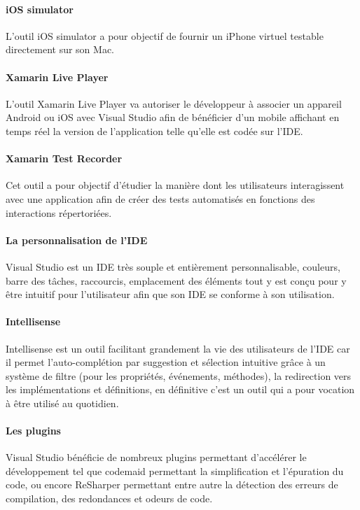 \documentclass[11]{article}
\begin{document}
\paragraph{iOS simulator}
L’outil iOS simulator a pour objectif de fournir un iPhone virtuel testable directement sur son Mac.

\paragraph{Xamarin Live Player}
L’outil Xamarin Live Player va autoriser le développeur à associer un appareil Android ou iOS avec Visual Studio afin de bénéficier d’un mobile affichant en temps réel la version de l’application telle qu’elle est codée sur l’IDE.
   
\paragraph{Xamarin Test Recorder}
Cet outil a pour objectif d’étudier la manière dont les utilisateurs interagissent avec une application afin de créer des tests automatisés en fonctions des interactions répertoriées.

\paragraph{La personnalisation de l’IDE}
Visual Studio est un IDE très souple et entièrement personnalisable, couleurs, barre des tâches, raccourcis, emplacement des éléments tout y est conçu pour y être intuitif pour l’utilisateur afin que son IDE se conforme à son utilisation.

\paragraph{Intellisense}
Intellisense est un outil facilitant grandement la vie des utilisateurs de l’IDE car il permet l’auto-complétion par suggestion et sélection intuitive grâce à un système de filtre (pour les propriétés, événements, méthodes), la redirection vers les implémentations et définitions, en définitive c’est un outil qui a pour vocation à être utilisé au quotidien.
    
\paragraph{Les plugins}
Visual Studio bénéficie de nombreux plugins permettant d’accélérer le développement tel que codemaid permettant la simplification et l’épuration du code, ou encore ReSharper permettant entre autre la détection des erreurs de compilation, des redondances et odeurs de code.
\end{document}
